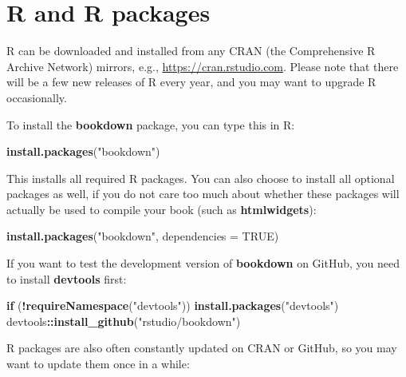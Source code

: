 \documentclass[
  12pt,
]{krantz}
\newenvironment{Shaded}{\begin{snugshade}}{\end{snugshade}}
\newcommand{\AttributeTok}[1]{\textcolor[rgb]{0.13,0.29,0.53}{#1}}
\newcommand{\ConstantTok}[1]{\textcolor[rgb]{0.56,0.35,0.01}{#1}}
\newcommand{\ControlFlowTok}[1]{\textcolor[rgb]{0.13,0.29,0.53}{\textbf{#1}}}
\newcommand{\FunctionTok}[1]{\textcolor[rgb]{0.13,0.29,0.53}{\textbf{#1}}}
\newcommand{\NormalTok}[1]{#1}
\newcommand{\SpecialCharTok}[1]{\textcolor[rgb]{0.81,0.36,0.00}{\textbf{#1}}}
\newcommand{\StringTok}[1]{\textcolor[rgb]{0.31,0.60,0.02}{#1}}
\theoremstyle{definition}
\theoremstyle{definition}
\theoremstyle{definition}
\theoremstyle{definition}
\theoremstyle{remark}
\begin{document}
\section{R and R packages}\label{r-and-r-packages}

R can be downloaded and installed from any CRAN (the Comprehensive R Archive Network) mirrors, e.g., \url{https://cran.rstudio.com}. Please note that there will be a few new releases of R every year, and you may want to upgrade R occasionally.

To install the \textbf{bookdown} package, you can type this in R:

\begin{Shaded}
\begin{Highlighting}[]
\FunctionTok{install.packages}\NormalTok{(}\StringTok{"bookdown"}\NormalTok{)}
\end{Highlighting}
\end{Shaded}

This installs all required R packages. You can also choose to install all optional packages as well, if you do not care too much about whether these packages will actually be used to compile your book (such as \textbf{htmlwidgets}):

\begin{Shaded}
\begin{Highlighting}[]
\FunctionTok{install.packages}\NormalTok{(}\StringTok{"bookdown"}\NormalTok{, }\AttributeTok{dependencies =} \ConstantTok{TRUE}\NormalTok{)}
\end{Highlighting}
\end{Shaded}

If you want to test the development version of \textbf{bookdown} on GitHub, you need to install \textbf{devtools} first:

\begin{Shaded}
\begin{Highlighting}[]
\ControlFlowTok{if}\NormalTok{ (}\SpecialCharTok{!}\FunctionTok{requireNamespace}\NormalTok{(}\StringTok{"devtools"}\NormalTok{)) }\FunctionTok{install.packages}\NormalTok{(}\StringTok{"devtools"}\NormalTok{)}
\NormalTok{devtools}\SpecialCharTok{::}\FunctionTok{install\_github}\NormalTok{(}\StringTok{"rstudio/bookdown"}\NormalTok{)}
\end{Highlighting}
\end{Shaded}

R packages are also often constantly updated on CRAN or GitHub, so you may want to update them once in a while:
\end{document}
